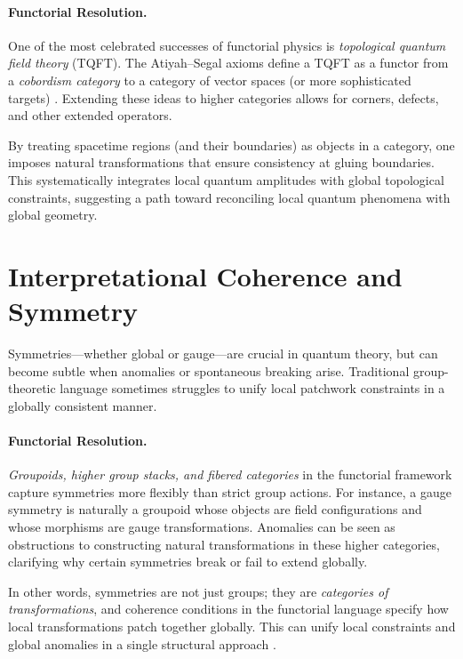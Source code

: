 \documentclass[12pt]{article}
\begin{document}
\paragraph{Functorial Resolution.}
One of the most celebrated successes of functorial physics is \emph{topological quantum field theory} (TQFT). The Atiyah--Segal axioms define a TQFT as a functor from a \emph{cobordism category} to a category of vector spaces (or more sophisticated targets) \cite{AtiyahTQFT, Segal}. Extending these ideas to higher categories allows for corners, defects, and other extended operators.  

By treating spacetime regions (and their boundaries) as objects in a category, one imposes natural transformations that ensure consistency at gluing boundaries. This systematically integrates local quantum amplitudes with global topological constraints, suggesting a path toward reconciling local quantum phenomena with global geometry.

\vspace{1em}

\section{Interpretational Coherence and Symmetry}
Symmetries---whether global or gauge---are crucial in quantum theory, but can become subtle when anomalies or spontaneous breaking arise. Traditional group-theoretic language sometimes struggles to unify local patchwork constraints in a globally consistent manner.

\paragraph{Functorial Resolution.}
\emph{Groupoids, higher group stacks, and fibered categories} in the functorial framework capture symmetries more flexibly than strict group actions. For instance, a gauge symmetry is naturally a groupoid whose objects are field configurations and whose morphisms are gauge transformations. Anomalies can be seen as obstructions to constructing natural transformations in these higher categories, clarifying why certain symmetries break or fail to extend globally.  

In other words, symmetries are not just groups; they are \emph{categories of transformations}, and coherence conditions in the functorial language specify how local transformations patch together globally. This can unify local constraints and global anomalies in a single structural approach \cite{BaezSchreiber}.
\end{document}
